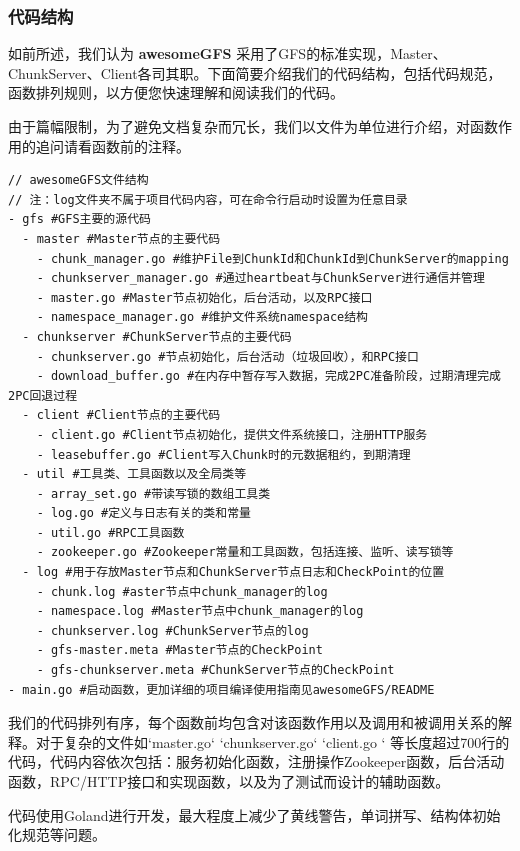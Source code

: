 \documentclass[UTF8]{ctexart}
\begin{document}
\subsubsection{代码结构}
如前所述，我们认为 \textbf{awesomeGFS} 采用了GFS的标准实现，Master、ChunkServer、Client各司其职。下面简要介绍我们的代码结构，包括代码规范，函数排列规则，以方便您快速理解和阅读我们的代码。

由于篇幅限制，为了避免文档复杂而冗长，我们以文件为单位进行介绍，对函数作用的追问请看函数前的注释。
\begin{lstlisting}
// awesomeGFS文件结构
// 注：log文件夹不属于项目代码内容，可在命令行启动时设置为任意目录
- gfs #GFS主要的源代码
  - master #Master节点的主要代码
   	- chunk_manager.go #维护File到ChunkId和ChunkId到ChunkServer的mapping
   	- chunkserver_manager.go #通过heartbeat与ChunkServer进行通信并管理
   	- master.go #Master节点初始化，后台活动，以及RPC接口
   	- namespace_manager.go #维护文件系统namespace结构
  - chunkserver #ChunkServer节点的主要代码
   	- chunkserver.go #节点初始化，后台活动（垃圾回收），和RPC接口
   	- download_buffer.go #在内存中暂存写入数据，完成2PC准备阶段，过期清理完成2PC回退过程
  - client #Client节点的主要代码
   	- client.go #Client节点初始化，提供文件系统接口，注册HTTP服务
   	- leasebuffer.go #Client写入Chunk时的元数据租约，到期清理
  - util #工具类、工具函数以及全局类等
   	- array_set.go #带读写锁的数组工具类
   	- log.go #定义与日志有关的类和常量
   	- util.go #RPC工具函数
   	- zookeeper.go #Zookeeper常量和工具函数，包括连接、监听、读写锁等
  - log #用于存放Master节点和ChunkServer节点日志和CheckPoint的位置
   	- chunk.log #aster节点中chunk_manager的log
   	- namespace.log #Master节点中chunk_manager的log
   	- chunkserver.log #ChunkServer节点的log
   	- gfs-master.meta #Master节点的CheckPoint
   	- gfs-chunkserver.meta #ChunkServer节点的CheckPoint
- main.go #启动函数，更加详细的项目编译使用指南见awesomeGFS/README
\end{lstlisting}
我们的代码排列有序，每个函数前均包含对该函数作用以及调用和被调用关系的解释。对于复杂的文件如`master.go` `chunkserver.go` `client.go ` 等长度超过700行的代码，代码内容依次包括：服务初始化函数，注册操作Zookeeper函数，后台活动函数，RPC/HTTP接口和实现函数，以及为了测试而设计的辅助函数。

代码使用Goland进行开发，最大程度上减少了黄线警告，单词拼写、结构体初始化规范等问题。
\end{document}
